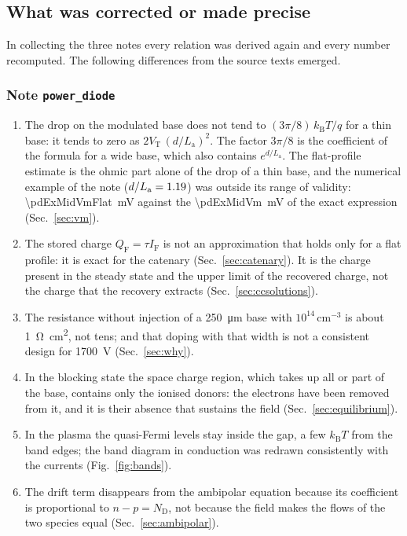 \documentclass[10pt,a4paper]{scrartcl}
\newcommand{\IF}{I_\mathrm{F}}
\newcommand{\VT}{V_\mathrm{T}}
\newcommand{\ND}{N_\mathrm{D}}
\newcommand{\La}{L_\mathrm{a}}
\newcommand{\QF}{Q_\mathrm{F}}
\newcommand{\kB}{k_\mathrm{B}}
\newcommand{\cmc}{\si{\centi\metre^{-3}}}
\begin{document}
\subsection{What was corrected or made precise}
In collecting the three notes every relation was derived again and every number recomputed. The following differences from the source texts emerged.

\subsubsection*{Note \texttt{power\_diode}}
\begin{enumerate}
\item The drop on the modulated base does not tend to $(3\pi/8)\,\kB T/q$ for a thin base: it tends to zero as $2\VT\,(d/\La)^2$. The factor $3\pi/8$ is the coefficient of the formula for a wide base, which also contains $e^{d/\La}$. The flat-profile estimate is the ohmic part alone of the drop of a thin base, and the numerical example of the note ($d/\La = \pdExMidBeta$) was outside its range of validity: \SI{\pdExMidVmFlat}{\milli\volt} against the \SI{\pdExMidVm}{\milli\volt} of the exact expression (Sec.~\ref{sec:vm}).
\item The stored charge $\QF = \tau\IF$ is not an approximation that holds only for a flat profile: it is exact for the catenary (Sec.~\ref{sec:catenary}). It is the charge present in the steady state and the upper limit of the recovered charge, not the charge that the recovery extracts (Sec.~\ref{sec:ccsolutions}).
\item The resistance without injection of a \SI{250}{\micro\metre} base with $10^{14}\,\cmc$ is about \SI{1}{\ohm\centi\metre\squared}, not tens; and that doping with that width is not a consistent design for \SI{1700}{\volt} (Sec.~\ref{sec:why}).
\item In the blocking state the space charge region, which takes up all or part of the base, contains only the ionised donors: the electrons have been removed from it, and it is their absence that sustains the field (Sec.~\ref{sec:equilibrium}).
\item In the plasma the quasi-Fermi levels stay inside the gap, a few $\kB T$ from the band edges; the band diagram in conduction was redrawn consistently with the currents (Fig.~\ref{fig:bands}).
\item The drift term disappears from the ambipolar equation because its coefficient is proportional to $n - p = \ND$, not because the field makes the flows of the two species equal (Sec.~\ref{sec:ambipolar}).

\end{enumerate}
\end{document}

